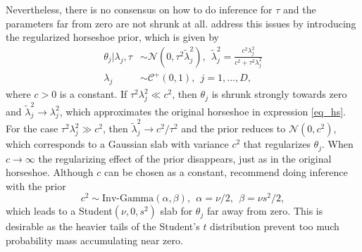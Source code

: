 Nevertheless, there is no consensus on how to do inference for $\tau$ and the parameters far from zero are not shrunk at all.
\cite{piironen_sparsity_2017} address this issues by introducing the regularized horseshoe prior, which is given by
\begin{equation}
    \begin{split}
        \theta_j | \lambda_j, \tau & \sim \mathcal N (0, \tau^2 \tilde \lambda^2_j),
        ~~ \tilde \lambda_j^2 = \displaystyle \frac{c^2 \lambda^2_j}{c^2 + \tau^2 \lambda_j^2}\\
        \lambda_j & \sim \mathcal C^+ (0, 1), ~~ j = 1,..., D,
    \end{split}
\end{equation}
where $c > 0$ is a constant.
If $\tau^2\lambda^2_j \ll c^2$, then $\theta_j$ is shrunk strongly towards zero and $\tilde \lambda^2_j \rightarrow \lambda^2_j$, which approximates the original horseshoe in expression \ref{eq_hs}.
For the case $\tau^2\lambda^2_j \gg c^2$, then $\tilde \lambda^2_j \rightarrow c^2/\tau^2$ and the prior reduces to $\mathcal N(0, c^2)$, which corresponds to a Gaussian slab with variance $c^2$ that regularizes $\theta_j$.
When $c \rightarrow \infty$ the regularizing effect of the prior disappears, just as in the original horseshoe.
Although $c$ can be chosen as a constant, \cite{piironen_sparsity_2017} recommend doing inference with the prior
\begin{equation*}
    c^2 \sim \text{Inv-Gamma}(\alpha, \beta), ~~ \alpha = \nu/2, ~~ \beta = \nu s^2/2,
\end{equation*}
which leads to a Student$(\nu, 0, s^2)$ slab for $\theta_j$ far away from zero.
This is desirable as the heavier tails of the Student's $t$ distribution prevent too much probability mass accumulating near zero.

